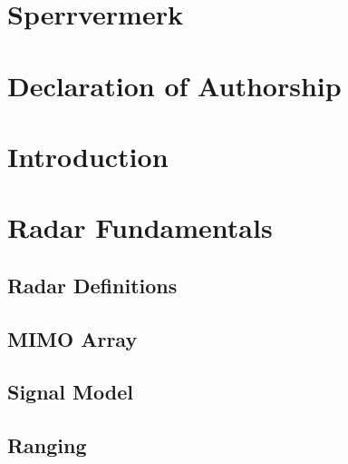 \documentclass[DIV=15,
fleqn
numbers=noenddot,
headsepline,
captions=tableabove,twoside, openright]{scrreprt}
\begin{document}


\chapter*{Sperrvermerk}

\chapter*{Declaration of Authorship}
\chapter*{}
\vspace*{8cm}
\thispagestyle{empty}

\tableofcontents	
\chapter{Introduction}
	\pagestyle{scrheadings}
	\clearscrheadfoot
	\ihead{\headmark}
	\ohead{\pagemark}
	
\chapter{Radar Fundamentals}\label{ch:basics}

\section{Radar Definitions}\label{bs:definitions}
 
 \section{MIMO Array}\label{bs:MIMO}
 
\section{Signal Model}\label{bs:signal}


\section{Ranging}\label{bs:ranging}
\end{document}
